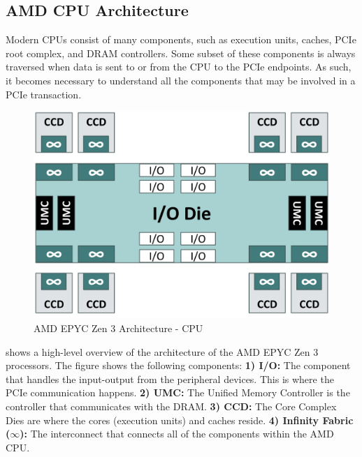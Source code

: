 \subsection{AMD CPU Architecture}
\label{subsec:amd-arch-bg}

Modern CPUs consist of many components, such as execution units, caches, PCIe root complex, and DRAM controllers.
Some subset of these components is always traversed when data is sent to or from the CPU to the PCIe endpoints.
As such, it becomes necessary to understand all the components that may be involved in a PCIe transaction.

\begin{figure}[!htb]
    \centering
    \includegraphics[width=\columnwidth]{figures/background/amd_arch/processor.png}
    \caption{AMD EPYC Zen 3 Architecture - CPU}
    \label{fig:amd-cpu}
\end{figure}


 shows a high-level overview of the architecture of the AMD EPYC Zen 3 processors.
The figure shows the following components:
\textbf{1) I/O:} The component that handles the input-output from the peripheral devices. This is where the PCIe communication happens.
\textbf{2) UMC:} The Unified Memory Controller is the controller that communicates with the DRAM.
\textbf{3) CCD:} The Core Complex Dies are where the cores (execution units) and caches reside.
\textbf{4) Infinity Fabric ($\infty$):} The interconnect that connects all of the components within the AMD CPU.

